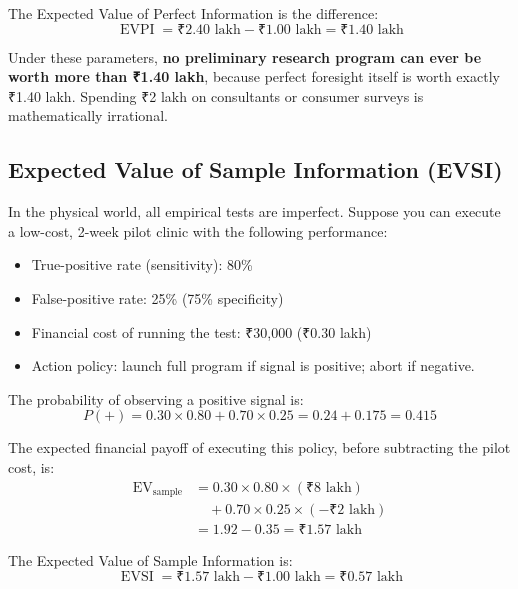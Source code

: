 The Expected Value of Perfect Information is the difference:
\begin{equation}
\operatorname{EVPI} = \text{₹}2.40\text{ lakh} - \text{₹}1.00\text{ lakh} = \text{₹}1.40\text{ lakh}
\end{equation}

Under these parameters, \textbf{no preliminary research program can ever be worth more than ₹1.40 lakh}, because perfect foresight itself is worth exactly ₹1.40 lakh. Spending ₹2 lakh on consultants or consumer surveys is mathematically irrational.

\subsection{Expected Value of Sample Information (EVSI)}

In the physical world, all empirical tests are imperfect. Suppose you can execute a low-cost, 2-week pilot clinic with the following performance:
\begin{itemize}[leftmargin=10pt,itemsep=1pt,topsep=1pt]
  \item True-positive rate (sensitivity): 80\%
  \item False-positive rate: 25\% (75\% specificity)
  \item Financial cost of running the test: ₹30,000 (₹0.30 lakh)
  \item Action policy: launch full program if signal is positive; abort if negative.
\end{itemize}

The probability of observing a positive signal is:
\begin{equation*}
P(+) = 0.30 \times 0.80 + 0.70 \times 0.25 = 0.24 + 0.175 = 0.415
\end{equation*}

The expected financial payoff of executing this policy, before subtracting the pilot cost, is:
\begin{align*}
\operatorname{EV}_{\text{sample}} &= 0.30 \times 0.80 \times (\text{₹}8\text{ lakh}) \\
&\quad + 0.70 \times 0.25 \times (-\text{₹}2\text{ lakh}) \\
&= 1.92 - 0.35 = \text{₹}1.57\text{ lakh}
\end{align*}

The Expected Value of Sample Information is:
\begin{equation}
\operatorname{EVSI} = \text{₹}1.57\text{ lakh} - \text{₹}1.00\text{ lakh} = \text{₹}0.57\text{ lakh}
\end{equation}

